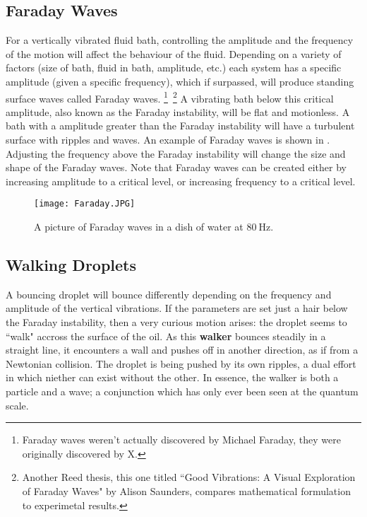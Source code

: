 \subsection{Faraday Waves}
	    For a vertically vibrated fluid bath, controlling the amplitude and the frequency of the motion will affect the behaviour of the fluid. Depending on a variety of factors (size of bath, fluid in bath, amplitude, etc.) each system has a specific amplitude (given a specific frequency), which if surpassed, will produce standing surface waves called Faraday waves. \footnote{Faraday waves weren't actually discovered by Michael Faraday, they were originally discovered by X.}~\footnote{Another Reed thesis, this one titled ``Good Vibrations: A Visual Exploration of Faraday Waves" by Alison Saunders, compares mathematical formulation to experimetal results.} A vibrating bath below this critical amplitude, also known as the Faraday instability, will be flat and motionless. A bath with a amplitude greater than the Faraday instability will have a turbulent surface with ripples and waves. An example of Faraday waves is shown in . Adjusting the frequency above the Faraday instability will change the size and shape of the Faraday waves. Note that Faraday waves can be created either by increasing amplitude to a critical level, or increasing frequency to a critical level.
	    
	    \begin{figure}[h!]
	\centering
	\texttt{[image: Faraday.JPG]}
	\caption{A picture of Faraday waves in a dish of water at $80~\mathrm{Hz}$.}
	\label{faraday waves}
\end{figure}

\subsection{Walking Droplets}
	    
	A bouncing droplet will bounce differently depending on the frequency and amplitude of the vertical vibrations. If the parameters are set just a hair below the Faraday instability, then a very curious motion arises: the droplet seems to ``walk" accross the surface of the oil. As this \textbf{walker} bounces steadily in a straight line, it encounters a wall and pushes off in another direction, as if from a Newtonian collision. The droplet is being pushed by its own ripples, a dual effort in which niether can exist without the other. In essence, the walker is both a particle and a wave; a conjunction which has only ever been seen at the quantum scale. 
	  
